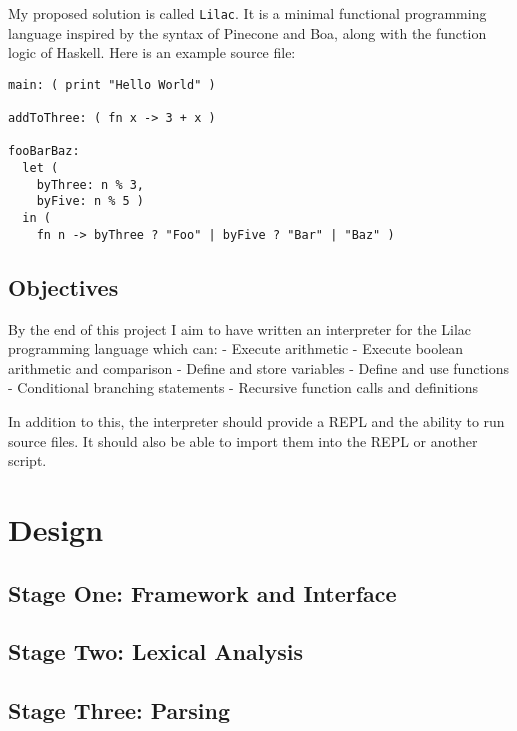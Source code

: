 \documentclass[11pt]{article}
\begin{document}
My proposed solution is called \texttt{Lilac}. It is a minimal
functional programming language inspired by the syntax of Pinecone and
Boa, along with the function logic of Haskell. Here is an example source
file:

\begin{verbatim}
main: ( print "Hello World" )

addToThree: ( fn x -> 3 + x )

fooBarBaz:
  let (
    byThree: n % 3,
    byFive: n % 5 )
  in (
    fn n -> byThree ? "Foo" | byFive ? "Bar" | "Baz" )
\end{verbatim}

\hypertarget{objectives}{%
\subsection{Objectives}\label{objectives}}

By the end of this project I aim to have written an interpreter for the
Lilac programming language which can: - Execute arithmetic - Execute
boolean arithmetic and comparison - Define and store variables - Define
and use functions - Conditional branching statements - Recursive
function calls and definitions

In addition to this, the interpreter should provide a REPL and the
ability to run source files. It should also be able to import them into
the REPL or another script.

\hypertarget{design}{%
\section{Design}\label{design}}

\hypertarget{stage-one-framework-and-interface}{%
\subsection{Stage One: Framework and
Interface}\label{stage-one-framework-and-interface}}

\hypertarget{stage-two-lexical-analysis}{%
\subsection{Stage Two: Lexical
Analysis}\label{stage-two-lexical-analysis}}

\hypertarget{stage-three-parsing}{%
\subsection{Stage Three: Parsing}\label{stage-three-parsing}}
\end{document}

